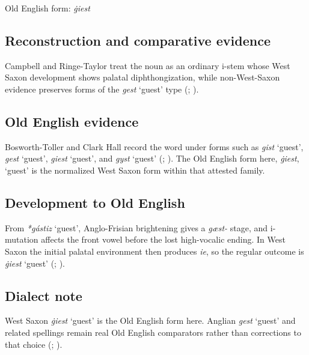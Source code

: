 \documentclass[
  british,
  a4paper,
  openany]{book}
\providecommand{\Recon}[1]{\emph{*#1}}
{\catcode`→=\active \global\def→{\ensuremath{\rightarrow}}}
\providecommand{\Recon}[1]{\emph{*#1}}
{\catcode`→=\active \global\def→{\ensuremath{\rightarrow}}}
\begin{document}
Old English form: \emph{ġiest}

\subsection{Reconstruction and comparative
evidence}\label{reconstruction-and-comparative-evidence-24}

Campbell and Ringe-Taylor treat the noun as an ordinary i-stem whose
West Saxon development shows palatal diphthongization, while
non-West-Saxon evidence preserves forms of the \emph{gest} `guest' type
(;
).

\subsection{Old English evidence}\label{old-english-evidence-24}

Bosworth-Toller and Clark Hall record the word under forms such as
\emph{gist} `guest', \emph{gest} `guest', \emph{giest} `guest', and
\emph{gyst} `guest' (; ). The Old
English form here, \emph{ġiest}, `guest' is the normalized West Saxon
form within that attested family.

\subsection{Development to Old
English}\label{development-to-old-english-24}

From \Recon{gástiz} `guest', Anglo-Frisian brightening gives a
\emph{gæst-} stage, and i-mutation affects the front vowel before the
lost high-vocalic ending. In West Saxon the initial palatal environment
then produces \emph{ie}, so the regular outcome is \emph{ġiest} `guest'
(;
).

\subsection{Dialect note}\label{dialect-note-1}

West Saxon \emph{ġiest} `guest' is the Old English form here. Anglian
\emph{gest} `guest' and related spellings remain real Old English
comparators rather than corrections to that choice
(;
).
\end{document}
